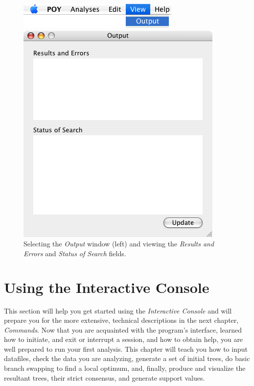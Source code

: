 \begin{figure}
\centering
\begin{minipage}[c]{0.48\textwidth}
   		\includegraphics[width=\textwidth]{doc/figures/view_menu.jpg}
\end{minipage}
\quad
\begin{minipage}[c]{0.48\textwidth}
	   	\includegraphics[width=\textwidth]{doc/figures/output_window.jpg}
   	\end{minipage}
\caption{Selecting the \emph{Output} window (left) and viewing the \emph{Results and Errors} and  \emph{Status of Search} fields.}
\label{fig:results_and_status_windows}
\end{figure}

\section{Using the Interactive Console} \label{interactiveconsole}

This section will help you get started using the \poy \emph{Interactive Console} and will prepare you for the
more extensive, technical descriptions in the next chapter, \emph{\poy Commands}. Now that you are acquainted with the program's interface, learned how to initiate, and exit or interrupt a \poy session, and how to obtain help, you are well prepared to run your first analysis. This chapter will teach
you how to input datafiles, check the data you are analyzing, generate
a set of initial trees, do basic branch swapping to find a local optimum, and, finally, produce
and visualize the resultant trees, their strict consensus, and generate support values.

